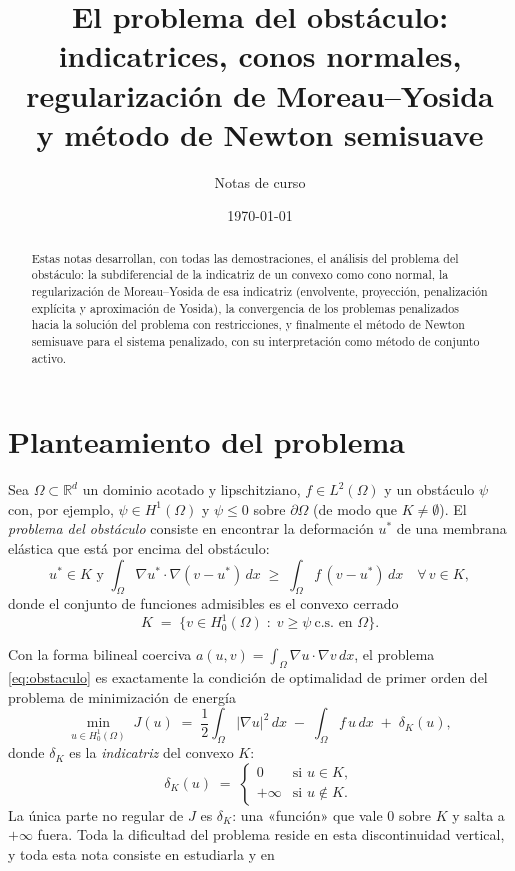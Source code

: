 \documentclass[11pt,a4paper]{article}
\title{\textbf{El problema del obstáculo:}\\[2mm]
\large indicatrices, conos normales, regularización de Moreau--Yosida\\
y método de Newton semisuave}
\author{Notas de curso}
\date{\today}
\theoremstyle{definition}
\theoremstyle{remark}
\newcommand{\R}{\mathbb{R}}
\newcommand{\dk}{\delta_K}
\begin{document}
\maketitle

\begin{abstract}
Estas notas desarrollan, con todas las demostraciones, el análisis del problema
del obstáculo: la subdiferencial de la indicatriz de un convexo como cono normal,
la regularización de Moreau--Yosida de esa indicatriz (envolvente, proyección,
penalización explícita y aproximación de Yosida), la convergencia de los problemas
penalizados hacia la solución del problema con restricciones, y finalmente el
método de Newton semisuave para el sistema penalizado, con su interpretación como
método de conjunto activo.
\end{abstract}

\tableofcontents

\section{Planteamiento del problema}

Sea $\Omega \subset \R^d$ un dominio acotado y lipschitziano,
$f \in L^2(\Omega)$ y un obstáculo $\psi$ con, por ejemplo,
$\psi \in H^1(\Omega)$ y $\psi \le 0$ sobre $\partial\Omega$
(de modo que $K \neq \emptyset$).
El \emph{problema del obstáculo} consiste en encontrar la deformación
$u^\ast$ de una membrana elástica que está por encima del obstáculo:
\begin{equation}\label{eq:obstaculo}
\boxed{\; u^\ast \in K \text{ y } \int_\Omega \nabla u^\ast \cdot \nabla(v - u^\ast)\,dx
\;\ge\; \int_\Omega f\,(v - u^\ast)\,dx
\quad \forall\, v \in K, \;}
\end{equation}
donde el conjunto de funciones admisibles es el convexo cerrado
\[
K \;=\; \bigl\{ v \in H^1_0(\Omega) \;:\; v \ge \psi \ \text{c.s. en } \Omega \bigr\}.
\]

Con la forma bilineal coerciva $a(u,v) = \int_\Omega \nabla u\cdot\nabla v\,dx$,
el problema \eqref{eq:obstaculo} es exactamente la condición de optimalidad
de primer orden del problema de minimización de energía
\begin{equation}\label{eq:minimizacion}
\min_{u \in H^1_0(\Omega)}\; J(u)
\;=\; \frac12 \int_\Omega |\nabla u|^2\,dx \;-\; \int_\Omega f\,u\,dx
\;+\; \dk(u),
\end{equation}
donde $\dk$ es la \emph{indicatriz} del convexo $K$:
\begin{equation}\label{eq:indicatriz}
\dk(u) \;=\;
\begin{cases}
0 & \text{si } u \in K,\\[1mm]
+\infty & \text{si } u \notin K.
\end{cases}
\end{equation}
La única parte no regular de $J$ es $\dk$: una «función» que vale $0$ sobre
$K$ y salta a $+\infty$ fuera. Toda la dificultad del problema reside en esta
discontinuidad vertical, y toda esta nota consiste en estudiarla y en
\end{document}
